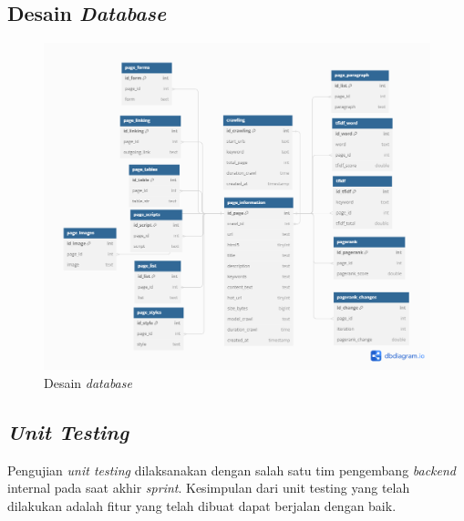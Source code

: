 \documentclass[
	a4paper, %
	10pt, %
	unnumberedsections, %
	twoside, %
]{LTJournalArticle}
\begin{document}
\subsection{Desain \textit{Database}}


\begin{figure}[H]
	\includegraphics[width=\linewidth]{erd.png}
	\caption{Desain \textit{database}}
	\label{gambar:db}
\end{figure}

\subsection{\textit{Unit Testing}}

Pengujian \textit{unit testing} dilaksanakan dengan salah satu tim pengembang \textit{backend} internal pada saat akhir \textit{sprint}. Kesimpulan dari unit testing yang telah dilakukan adalah fitur yang telah dibuat dapat berjalan dengan baik.
\end{document}
